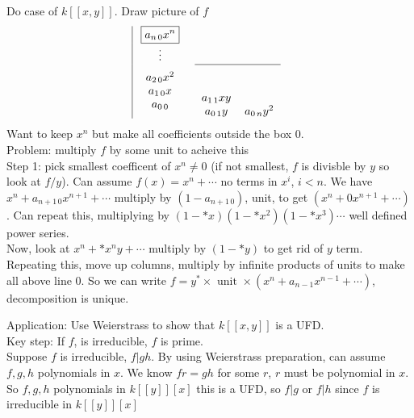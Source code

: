 \begin{pf}
    Do case of $k[[x,y]]$. Draw picture of $f$ 
    \[ \begin{tabular}{| c c}
        $\boxed{a_{n \, 0}x^n}$ & \\ 
        $\vdots$ & \\ 
        \begin{tabular}{c}
           $ a_{2 \, 0}x^2$ \\ $a_{1 \, 0}x$ \\ $a_{0 \, 0}$
        \end{tabular} & 
        \begin{tabular}{c c}
            \hline \\ 
            & \\ 
            $a_{1 \, 1}xy$ & \\ 
            $a_{0 \, 1}y$ & $a_{0 \, n}y^2$ 
        \end{tabular}
    \end{tabular} \]
    Want to keep $x^n$ but make all coefficients outside the box 0. \\
    Problem: multiply $f$ by some unit to acheive this \\
    Step 1: pick smallest coefficent of $x^n \neq 0$ (if not smallest, $f$ is divisble by $y$ so look at $f/y$). Can assume $f(x) = x^n + \cdots$ no terms in $x^i$, $i < n$. We have $x^n + a_{n+1 \, 0}x^{n+1} + \cdots$ multiply by $(1 - a_{n+1 \, 0})$, unit, to get $(x^n + 0x^{n+1} + \cdots)$. Can repeat this, multiplying by $(1 - *x)(1 - *x^2)(1 - *x^3) \cdots$ well defined power series. \\
    Now, look at $x^n + *x^ny + \cdots $ multiply by $(1 -*y)$ to get rid of $y$ term. Repeating this, move up columns, multiply by infinite products of units to make all above line 0. So we can write $f = y^* \times \text{ unit } \times (x^n + a_{n-1}x^{n-1} + \cdots)$, decomposition is unique. 
\end{pf} 

\noindent
Application: Use Weierstrass to show that $k[[x,y]]$ is a UFD. \\
Key step: If $f$, is irreducible, $f$ is prime. \\
Suppose $f$ is irreducible, $f|gh$. By using Weierstrass preparation, can assume $f,g,h$ polynomials in $x$. We know $fr = gh$ for some $r$, $r$ must be polynomial in $x$. So $f,g,h$ polynomials in $k[[y]][x]$ this is a UFD, so $f|g$ or $f|h$ since $f$ is irreducible in $k[[y]][x]$ \\

